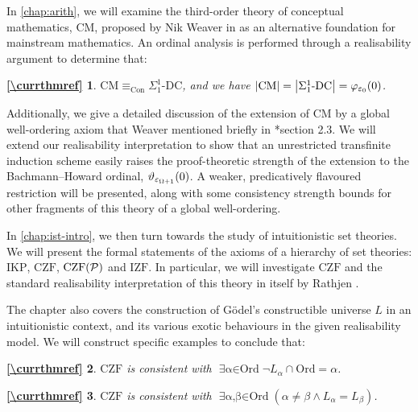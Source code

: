\documentclass[12pt,openany]{book}
\theoremstyle{plain}
\newtheorem*{refthm}{\autoref{\currthmref}}
\theoremstyle{definition}
\newcommand\opE[1]{\mathop{\exists #1}}
\DeclareMathOperator\Con{Con}
\newcommand\Pow{\mathcal{P}}
\newcommand\DC{\text{-}\mathrm{DC}}
\newcommand\CZF{\mathrm{CZF}}
\newcommand\CZFP{\mathrm{CZF}\mleft(\Pow\mright)}
\newcommand\IKP{\mathrm{IKP}}
\newcommand\IZF{\mathrm{IZF}}
\newcommand\CM{\mathrm{CM}}
\newcommand\Ord{\mathrm{Ord}}
\begin{document}
In \autoref{chap:arith}, we will examine the third-order theory of conceptual mathematics, $\CM$, proposed by Nik Weaver in \cite{weaver09-cm} as an alternative foundation for mainstream mathematics. An ordinal analysis is performed through a realisability argument to determine that:
\def\currthmref{cor:cm-oa}
\begin{refthm}
  $\CM \equiv_{\Con} \Sigma^1_1\DC$, and we have $\left|\CM\right| = \left|\Sigma^1_1\DC\right| = \varphi_{\varepsilon_0}\mleft(0\mright)$.
\end{refthm}

Additionally, we give a detailed discussion of the extension of $\CM$ by a global well-ordering axiom that Weaver mentioned briefly in \cite{weaver09-cm}*{section 2.3}. We will extend our realisability interpretation to show that an unrestricted transfinite induction scheme easily raises the proof-theoretic strength of the extension to the Bachmann--Howard ordinal, $\vartheta_{\varepsilon_{\Omega + 1}}\mleft(0\mright)$. A weaker, predicatively flavoured restriction will be presented, along with some consistency strength bounds for other fragments of this theory of a global well-ordering.

In \autoref{chap:ist-intro}, we then turn towards the study of intuitionistic set theories. We will present the formal statements of the axioms of a hierarchy of set theories: $\IKP$, $\CZF$, $\CZFP$ and $\IZF$. In particular, we will investigate $\CZF$ and the standard realisability interpretation of this theory in itself by Rathjen \cite{rathjen06-czf-realizability}.

The chapter also covers the construction of G\"odel's constructible universe $L$ in an intuitionistic context, and its various exotic behaviours in the given realisability model. We will construct specific examples to conclude that:
\def\currthmref{cor:czf-real-alpha-l-alpha-mismatch}
\begin{refthm}
  $\CZF$ is consistent with $\opE{\alpha \in \Ord} \neg L_\alpha \cap \Ord = \alpha$.
\end{refthm}

\def\currthmref{cor:exo-omega-same-l}
\begin{refthm}
  $\CZF$ is consistent with $\opE{\alpha, \beta \in \Ord} \left(\alpha \neq \beta \land L_\alpha = L_\beta\right)$.
\end{refthm}
\end{document}
